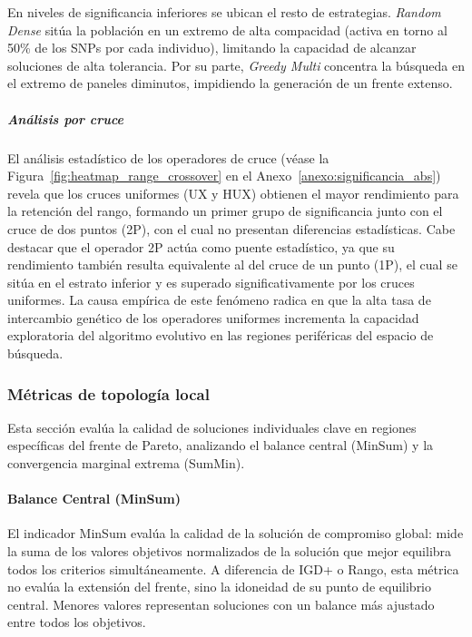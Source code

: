 En niveles de significancia inferiores se ubican el resto de estrategias. \textit{Random Dense} sitúa la población en un extremo de alta compacidad (activa en torno al 50\% de los SNPs por cada individuo), limitando la capacidad de alcanzar soluciones de alta tolerancia. Por su parte, \textit{Greedy Multi} concentra la búsqueda en el extremo de paneles diminutos, impidiendo la generación de un frente extenso.

\subparagraph{Análisis por cruce}

El análisis estadístico de los operadores de cruce (véase la Figura~\ref{fig:heatmap_range_crossover} en el Anexo~\ref{anexo:significancia_abs}) revela que los cruces uniformes (UX y HUX) obtienen el mayor rendimiento para la retención del rango, formando un primer grupo de significancia junto con el cruce de dos puntos (2P), con el cual no presentan diferencias estadísticas. Cabe destacar que el operador 2P actúa como puente estadístico, ya que su rendimiento también resulta equivalente al del cruce de un punto (1P), el cual se sitúa en el estrato inferior y es superado significativamente por los cruces uniformes. La causa empírica de este fenómeno radica en que la alta tasa de intercambio genético de los operadores uniformes incrementa la capacidad exploratoria del algoritmo evolutivo en las regiones periféricas del espacio de búsqueda.





\subsubsection{Métricas de topología local}

Esta sección evalúa la calidad de soluciones individuales clave en regiones específicas del frente de Pareto, analizando el balance central (MinSum) y la convergencia marginal extrema (SumMin).

\paragraph{Balance Central (MinSum)}

El indicador MinSum evalúa la calidad de la solución de compromiso global: mide la suma de los valores objetivos normalizados de la solución que mejor equilibra todos los criterios simultáneamente. A diferencia de IGD+ o Rango, esta métrica no evalúa la extensión del frente, sino la idoneidad de su punto de equilibrio central. Menores valores representan soluciones con un balance más ajustado entre todos los objetivos.

